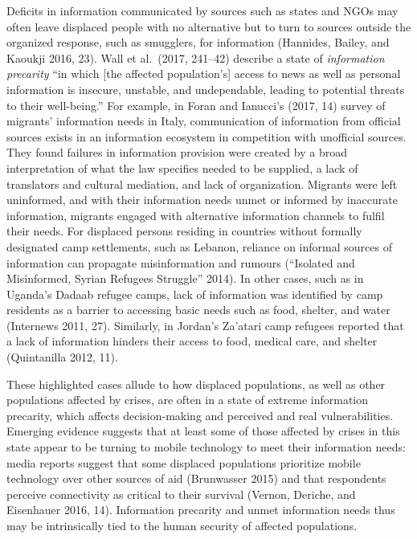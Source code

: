 Deficits in information communicated by sources such as states and NGOs
may often leave displaced people with no alternative but to turn to
sources outside the organized response, such as smugglers, for
information (Hannides, Bailey, and Kaoukji 2016, 23). Wall et al.~(2017,
241--42) describe a state of \emph{information precarity} ``in which
{[}the affected population's{]} access to news as well as personal
information is insecure, unstable, and undependable, leading to
potential threats to their well-being.'' For example, in Foran and
Ianucci's (2017, 14) survey of migrants' information needs in Italy,
communication of information from official sources exists in an
information ecosystem in competition with unofficial sources. They found
failures in information provision were created by a broad interpretation
of what the law specifies needed to be supplied, a lack of translators
and cultural mediation, and lack of organization. Migrants were left
uninformed, and with their information needs unmet or informed by
inaccurate information, migrants engaged with alternative information
channels to fulfil their needs. For displaced persons residing in
countries without formally designated camp settlements, such as Lebanon,
reliance on informal sources of information can propagate misinformation
and rumours (``Isolated and Misinformed, Syrian Refugees Struggle''
2014). In other cases, such as in Uganda's Dadaab refugee camps, lack of
information was identified by camp residents as a barrier to accessing
basic needs such as food, shelter, and water (Internews 2011, 27).
Similarly, in Jordan's Za'atari camp refugees reported that a lack of
information hinders their access to food, medical care, and shelter
(Quintanilla 2012, 11).

These highlighted cases allude to how displaced populations, as well as
other populations affected by crises, are often in a state of extreme
information precarity, which affects decision-making and perceived and
real vulnerabilities. Emerging evidence suggests that at least some of
those affected by crises in this state appear to be turning to mobile
technology to meet their information needs: media reports suggest that
some displaced populations prioritize mobile technology over other
sources of aid (Brunwasser 2015) and that respondents perceive
connectivity as critical to their survival (Vernon, Deriche, and
Eisenhauer 2016, 14). Information precarity and unmet information needs
thus may be intrinsically tied to the human security of affected
populations.

